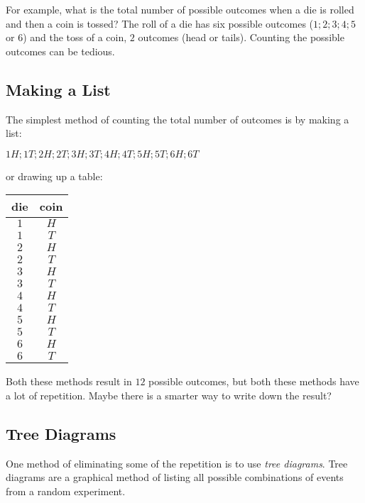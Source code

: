 For example, what is the total number of possible outcomes when a die is rolled and then a coin is tossed? The roll of a die has six possible outcomes ($1; 2; 3; 4; 5$ or $6$) and the toss of a coin, $2$ outcomes (head or tails). Counting the possible outcomes can be tedious.

\subsection{Making a List}
The simplest method of counting the total number of outcomes is by making a list:

\begin{center}
$1H; 1T; 2H; 2T; 3H; 3T; 4H; 4T; 5H; 5T; 6H; 6T$
\end{center}

or drawing up a table:

\begin{center}
\begin{tabular}{|c|c|}\hline
die & coin\\\hline\hline
$1$&$H$\\\hline
$1$&$T$\\\hline
$2$&$H$\\\hline
$2$&$T$\\\hline
$3$&$H$\\\hline
$3$&$T$\\\hline
$4$&$H$\\\hline
$4$&$T$\\\hline
$5$&$H$\\\hline
$5$&$T$\\\hline
$6$&$H$\\\hline
$6$&$T$\\\hline
\end{tabular}
\end{center}

Both these methods result in $12$ possible outcomes, but both these methods have a lot of repetition. Maybe there is a smarter way to write down the result?

\subsection{Tree Diagrams}
One method of eliminating some of the repetition is to use \textit{tree diagrams}. Tree diagrams are a graphical method of listing all possible combinations of events from a random experiment.

